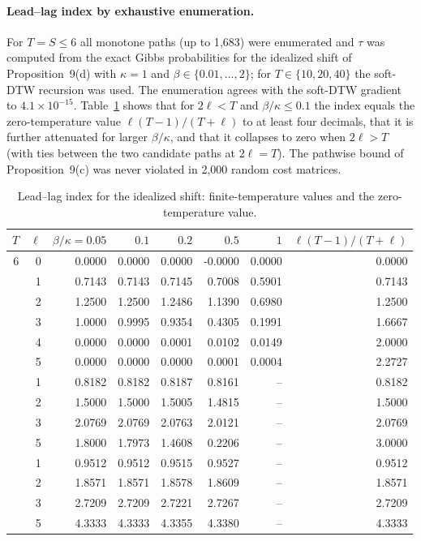 \documentclass[12pt]{article}
\begin{document}
\paragraph{Lead--lag index by exhaustive enumeration.} For $T=S\le6$ all monotone paths (up to 1{,}683) were enumerated and $\tau$ was computed from the exact Gibbs probabilities for the idealized shift of Proposition~9(d) with $\kappa=1$ and $\beta\in\{0.01,\dots,2\}$; for $T\in\{10,20,40\}$ the soft-DTW recursion was used. The enumeration agrees with the soft-DTW gradient to $4.1\times10^{-15}$. Table~\ref{tab:enum} shows that for $2\ell<T$ and $\beta/\kappa\le0.1$ the index equals the zero-temperature value $\ell(T-1)/(T+\ell)$ to at least four decimals, that it is further attenuated for larger $\beta/\kappa$, and that it collapses to zero when $2\ell>T$ (with ties between the two candidate paths at $2\ell=T$). The pathwise bound of Proposition~9(c) was never violated in 2{,}000 random cost matrices.

\begin{table}[h]
\caption{Lead--lag index for the idealized shift: finite-temperature values and the zero-temperature value.}\label{tab:enum}
\centering\footnotesize
\begin{tabular}{rrrrrrrr}
\toprule
$T$ & $\ell$ & $\beta/\kappa=0.05$ & $0.1$ & $0.2$ & $0.5$ & $1$ & $\ell(T-1)/(T+\ell)$\\
\midrule
6 & 0 & 0.0000 & 0.0000 & 0.0000 & -0.0000 & 0.0000 & 0.0000\\
 & 1 & 0.7143 & 0.7143 & 0.7145 & 0.7008 & 0.5901 & 0.7143\\
 & 2 & 1.2500 & 1.2500 & 1.2486 & 1.1390 & 0.6980 & 1.2500\\
 & 3 & 1.0000 & 0.9995 & 0.9354 & 0.4305 & 0.1991 & 1.6667\\
 & 4 & 0.0000 & 0.0000 & 0.0001 & 0.0102 & 0.0149 & 2.0000\\
 & 5 & 0.0000 & 0.0000 & 0.0000 & 0.0001 & 0.0004 & 2.2727\\
\addlinespace
10 & 1 & 0.8182 & 0.8182 & 0.8187 & 0.8161 & -- & 0.8182\\
 & 2 & 1.5000 & 1.5000 & 1.5005 & 1.4815 & -- & 1.5000\\
 & 3 & 2.0769 & 2.0769 & 2.0763 & 2.0121 & -- & 2.0769\\
 & 5 & 1.8000 & 1.7973 & 1.4608 & 0.2206 & -- & 3.0000\\
\addlinespace
40 & 1 & 0.9512 & 0.9512 & 0.9515 & 0.9527 & -- & 0.9512\\
 & 2 & 1.8571 & 1.8571 & 1.8578 & 1.8609 & -- & 1.8571\\
 & 3 & 2.7209 & 2.7209 & 2.7221 & 2.7267 & -- & 2.7209\\
 & 5 & 4.3333 & 4.3333 & 4.3355 & 4.3380 & -- & 4.3333\\
\bottomrule
\end{tabular}

\end{table}
\end{document}
